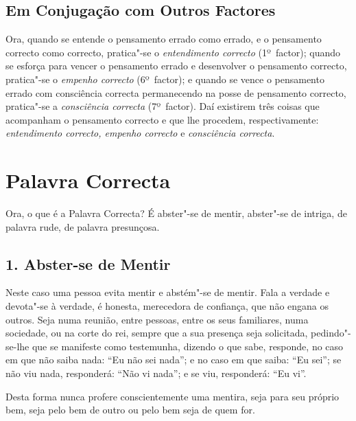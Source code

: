 
\subsection{Em Conjugação com Outros Factores}

Ora, quando se entende o pensamento errado como errado, e o pensamento correcto
como correcto, pratica"-se o \emph{entendimento correcto} (1º~factor); quando se
esforça para vencer o pensamento errado e desenvolver o pensamento correcto,
pratica"-se o \emph{empenho correcto} (6º~factor); e quando se vence o pensamento
errado com consciência correcta permanecendo na posse de pensamento correcto,
pratica"-se a \emph{consciência correcta} (7º~factor). Daí existirem três coisas
que acompanham o pensamento correcto e que lhe procedem, respectivamente:
\emph{entendimento correcto, empenho correcto} e \emph{consciência correcta}.


\clearpage

\section{Palavra Correcta}



Ora, o que é a Palavra Correcta? É abster"-se de mentir, abster"-se de intriga, de
palavra rude, de palavra presunçosa.


\subsection{1. Abster-se de Mentir}

Neste caso uma pessoa evita mentir e abstém"-se de mentir. Fala a verdade e
devota"-se à verdade, é honesta, merecedora de confiança, que não engana os
outros. Seja numa reunião, entre pessoas, entre os seus familiares, numa
sociedade, ou na corte do rei, sempre que a sua presença seja solicitada,
pedindo"-se-lhe que se manifeste como testemunha, dizendo o que sabe, responde,
no caso em que não saiba nada: “Eu não sei nada”; e no caso em que saiba: “Eu
sei”; se não viu nada, responderá: “Não vi nada”; e se viu, responderá: “Eu
vi”.

Desta forma nunca profere conscientemente uma mentira, seja para seu próprio
bem, seja pelo bem de outro ou pelo bem seja de quem for.

